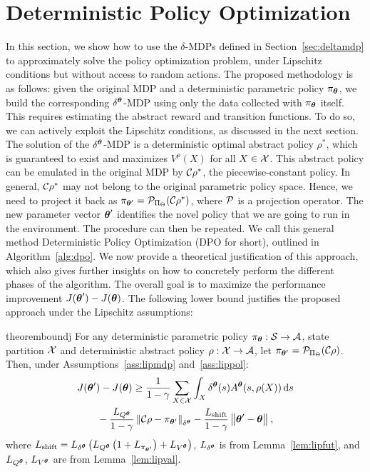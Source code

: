 \section{Deterministic Policy Optimization}\label{sec:algo}
In this section, we show how to use the $\delta$-MDPs defined in Section~\ref{sec:deltamdp} to approximately solve the policy optimization problem, under Lipschitz conditions but without access to random actions.
%
The proposed methodology is as follows: given the original MDP and a deterministic parametric policy $\pi_{\vtheta}$, we build the corresponding  $\delta^{\vtheta}$-MDP using only the data collected with $\pi_{\vtheta}$ itself. This requires estimating the abstract reward and transition functions. To do so, we can actively exploit the Lipschitz conditions, as discussed in the next section.
The solution of the $\delta^{\vtheta}$-MDP is a deterministic optimal abstract policy $\rho^{*}$, which is guaranteed to exist and maximizes $V^{\rho}(X)$ for all $X\in\Xspace$. This abstract policy can be emulated in the original MDP by $\Conc\rho^{*}$, the piecewise-constant policy. In general, $\Conc\rho^{*}$ may not belong to the original parametric policy space. Hence, we need to project it back as $\pi_{\vtheta'} = \Proj_{\Pi_{\Theta}}(\Conc\rho^{*})$, where $\Proj$ is a projection operator. The new parameter vector $\vtheta'$ identifies the novel policy that we are going to run in the environment. The procedure can then be repeated. We call this general method Deterministic Policy Optimization (DPO for short), outlined in Algorithm~\ref{alg:dpo}.
We now provide a theoretical justification of this approach, which also gives further insights on how to concretely perform the different phases of the algorithm. 
The overall goal is to maximize the performance improvement $J(\vtheta') - J(\vtheta)$. The following lower bound
justifies the proposed approach under the Lipschitz assumptions:
%
\begin{restatable}{theorem}{boundj}\label{lem:boundj}
	For any deterministic parametric policy ${\pi_{\vtheta}:\Sspace\to\Aspace}$, state partition $\Xspace$ and deterministic abstract policy ${\rho:\Xspace\to\Aspace}$, let $\pi_{\vtheta'} = \Proj_{\Pi_{\Theta}}(\Conc\rho)$. Then, under Assumptions~\ref{ass:lipmdp} and~\ref{ass:lippol}:
	\begin{align*}
	&J(\vtheta') - J(\vtheta) \geq \frac{1}{1-\gamma}\sum_{X\in\Xspace}\int_{X}\delta^{\vtheta}(s)A^{\vtheta}(s,\rho(X)) \de s 
	\nonumber\\&\qquad- \frac{L_{Q^{\vtheta}}}{1-\gamma}\norm[\delta^{\vtheta}]{\Conc\rho - \pi_{\vtheta'}} 
	-\frac{L_{\text{shift}}}{1-\gamma} \norm{\vtheta'-\vtheta},
	\end{align*}
	where $L_{\text{shift}}=L_{\delta^{\vtheta}}\left(L_{Q^{\vtheta}}\left(1+L_{\pi_{\vtheta'}}\right)+L_{V^{\vtheta}}\right)$, $L_{\delta^{\vtheta}}$ is from Lemma~\ref{lem:lipfut}, and $L_{Q^{\vtheta}}$, $L_{V^{\vtheta}}$ are from Lemma~\ref{lem:lipval}. 
\end{restatable}
